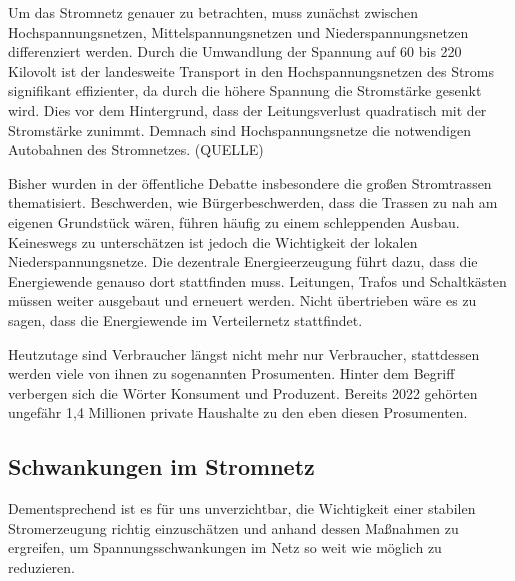 \documentclass[12pt, a4paper]{article}
\begin{document}

Um das Stromnetz genauer zu betrachten, muss zunächst zwischen Hochspannungsnetzen, Mittelspannungsnetzen und Niederspannungsnetzen differenziert werden. Durch die Umwandlung der Spannung auf 60 bis 220 Kilovolt ist der landesweite Transport in den Hochspannungsnetzen des Stroms signifikant effizienter, da durch die höhere Spannung die Stromstärke gesenkt wird. Dies vor dem Hintergrund, dass der Leitungsverlust quadratisch mit der Stromstärke zunimmt. Demnach sind Hochspannungsnetze die notwendigen Autobahnen des Stromnetzes. (QUELLE)

Bisher wurden in der öffentliche Debatte insbesondere die großen Stromtrassen thematisiert. Beschwerden, wie Bürgerbeschwerden, dass die Trassen zu nah am eigenen Grundstück wären, führen häufig zu einem schleppenden Ausbau. Keineswegs zu unterschätzen ist jedoch die Wichtigkeit der lokalen Niederspannungsnetze. Die dezentrale Energieerzeugung führt dazu, dass die Energiewende genauso dort stattfinden muss. Leitungen, Trafos und Schaltkästen müssen weiter ausgebaut und erneuert werden. Nicht übertrieben wäre es zu sagen, dass die Energiewende im Verteilernetz stattfindet.

Heutzutage sind Verbraucher längst nicht mehr nur Verbraucher, stattdessen werden viele von ihnen zu sogenannten Prosumenten. Hinter dem Begriff verbergen sich die Wörter Konsument und Produzent. Bereits 2022 gehörten ungefähr 1,4 Millionen private Haushalte zu den eben diesen Prosumenten. 




\subsection{Schwankungen im Stromnetz}

Dementsprechend ist es für uns unverzichtbar, die Wichtigkeit einer stabilen \linebreak Stromerzeugung richtig einzuschätzen und anhand dessen Maßnahmen zu ergreifen, um Spannungsschwankungen im Netz so weit wie möglich zu reduzieren.
\end{document}
